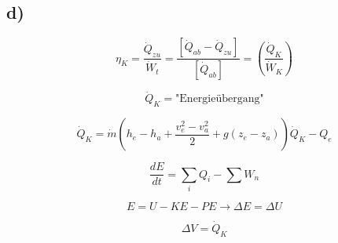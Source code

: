 

\subsection*{d)}

\begin{equation*}
    \eta_{K} = \frac{\dot{Q}_{zu}}{\dot{W}_{t}} = \frac{[\dot{Q}_{ab} - \dot{Q}_{zu}]}{[\dot{Q}_{ab}]} = \left( \frac{\dot{Q}_K}{\dot{W}_K} \right)
\end{equation*}

\begin{equation*}
    \dot{Q}_K = \text{"Energieübergang"}
\end{equation*}

\begin{equation*}
    \dot{Q}_K = \dot{m} (h_e - h_a + \frac{v_e^2 - v_a^2}{2} + g(z_e - z_a)) \dot{Q}_K - Q_e
\end{equation*}

\begin{equation*}
    \frac{dE}{dt} = \sum_i Q_i - \sum W_n
\end{equation*}

\begin{equation*}
    E = U - KE - PE \rightarrow \Delta E = \Delta U
\end{equation*}

\begin{equation*}
    \Delta V = \dot{Q}_K
\end{equation*}